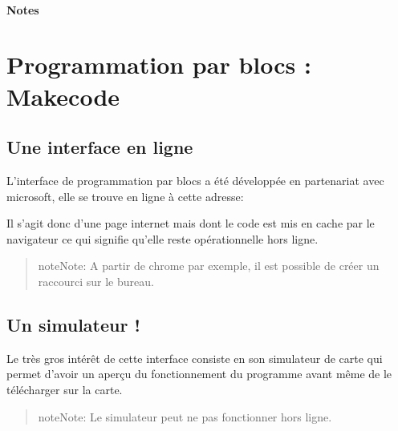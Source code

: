 \documentclass[letterpaper,10pt,french]{sphinxmanual}
\begin{document}
\paragraph{Notes}


\section{Programmation par blocs :  Makecode}
\label{\detokenize{decouverte/prise_en_main_blocs:dec-blocs}}\label{\detokenize{decouverte/prise_en_main_blocs:programmation-par-blocs-makecode}}\label{\detokenize{decouverte/prise_en_main_blocs::doc}}

\subsection{Une interface en ligne}
\label{\detokenize{decouverte/prise_en_main_blocs:une-interface-en-ligne}}
L’interface de programmation par blocs a été développée en
partenariat avec microsoft, elle se trouve en ligne à cette adresse:

Il s’agit donc d’une page internet mais dont le code est mis en cache par le navigateur
ce qui signifie qu’elle reste opérationnelle hors ligne.
\begin{quote}

\begin{sphinxadmonition}{note}{Note:}
A partir de chrome par exemple, il est possible de créer un raccourci sur le bureau.
\end{sphinxadmonition}
\end{quote}


\subsection{Un simulateur !}
\label{\detokenize{decouverte/prise_en_main_blocs:un-simulateur}}
Le très gros intérêt de cette interface consiste en son simulateur de carte qui
permet d’avoir un aperçu du fonctionnement du programme avant même de
le télécharger sur la carte.
\begin{quote}

\begin{sphinxadmonition}{note}{Note:}
Le simulateur peut ne pas fonctionner hors ligne.
\end{sphinxadmonition}
\end{quote}
\end{document}
